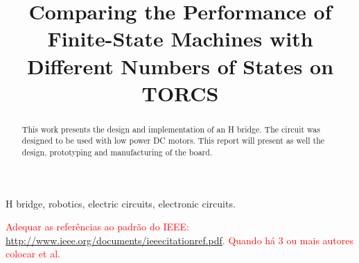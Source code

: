 \documentclass[journal]{IEEEtran}
\newcommand{\toDo}[1]{\textcolor{red}{#1}}
\begin{document}
    \title{Comparing the Performance of\\Finite-State Machines with\\Different Numbers of States on TORCS}
    
    \author{
        }
    
    \maketitle
    
    \begin{abstract}
        
        This work presents the design and implementation of an H bridge. The circuit was designed to be used with low power DC motors. This report will present as well the design, prototyping and manufacturing of the board.
                
    \end{abstract}
    
    \begin{IEEEkeywords}
        H bridge, robotics, electric circuits, electronic circuits.        
    \end{IEEEkeywords}
    
 
    
    
    
    
    \toDo{Adequar as referências ao padrão do IEEE: \url{http://www.ieee.org/documents/ieeecitationref.pdf}. Quando
    há 3 ou mais autores colocar et al.}
    
    
    
\end{document}
